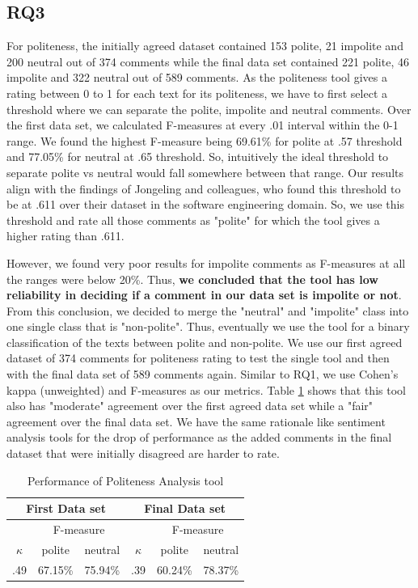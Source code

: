 \subsection{RQ3}

For politeness, the initially agreed dataset contained 153 polite, 21 impolite and 200 neutral out of 374 comments while the final data set contained 221 polite, 46 impolite and 322 neutral out of 589 comments. As 
the politeness tool
gives a rating between 0 to 1 for each text for its politeness, we have to first select a threshold where we can separate the polite, impolite and neutral comments. Over the first data set, we calculated F-measures at every .01 interval within the 0-1 range. We found the highest F-measure being 69.61\%  for polite at .57 threshold and 77.05\% for neutral at .65 threshold. So, intuitively the ideal threshold to separate polite vs neutral would fall somewhere between that range. Our results align with the findings of Jongeling and colleagues, who found this threshold to be at .611 over their dataset in the software engineering domain. So, we use this threshold and rate all those comments as "polite" for which the tool gives a higher rating than .611.

However, we found 
very poor results
for impolite comments as F-measures at all the ranges were below 20\%. Thus, \textbf{we concluded that the tool has low reliability in deciding if a comment in our data set is impolite or not}. From this conclusion, we decided to merge the "neutral" and "impolite" class into one single class that is "non-polite". Thus, eventually we use the tool for a binary classification of the texts between polite and non-polite.
We use our first agreed dataset of 374 comments for politeness rating to test the single tool and then with the final data set of 589 comments again. Similar to RQ1, we use Cohen's kappa (unweighted) and F-measures as our metrics. Table \ref{polresult} shows that this tool also has "moderate" agreement over the first agreed data set while a "fair" agreement over the final data set. We have the same rationale like sentiment analysis tools for the drop of performance as the added comments in the final dataset that were initially disagreed are harder to rate.  

\vspace{3mm}
\noindent{}

\begin{table}
\centering
\caption{Performance of Politeness Analysis tool}
\label{polresult}
\begin{tabular}{|c|c|c|c|c|c|}
\hline
\multicolumn{3}{|c|}{ First Data set }& \multicolumn{3}{c|}{ Final Data set } \\
\hline
 & \multicolumn{2}{c|}{ F-measure } & & \multicolumn{2}{c|}{ F-measure } \\
 \hline
$\kappa$ & polite & neutral & $\kappa$ & polite & neutral \\
\hline
.49 & 67.15\% & 75.94\% & .39 & 60.24\% & 78.37\%\\
\hline
\end{tabular}
\end{table}

